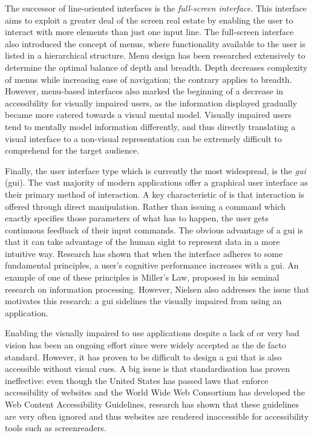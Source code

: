 The successor of line-oriented interfaces is the \textit{full-screen interface}. This interface aims to exploit a greater deal of the screen real estate by enabling the user to interact with more elements than just one input line. The full-screen interface also introduced the concept of menus, where functionality available to the user is listed in a hierarchical structure. Menu design has been researched extensively\cite{paap1986optimal, landauer1985selection, fisher1990optimal} to determine the optimal balance of depth and breadth. Depth decreases complexity of menus while increasing ease of navigation; the contrary applies to breadth. However, menu-based interfaces also marked the beginning of a decrease in accessibility for visually impaired users, as the information displayed gradually became more catered towards a visual mental model. Visually impaired users tend to mentally model information differently, and thus directly translating a visual interface to a non-visual representation can be extremely difficult to comprehend for the target audience\cite{edwards1994providing}.

Finally, the user interface type which is currently the most widespread, is the \textit{\acrlong{gui}} (\acrshort{gui}). The vast majority of modern applications offer a graphical user interface as their primary method of interaction. A key characteristic of  is that interaction is offered through direct manipulation. Rather than issuing a command which exactly specifies those parameters of what has to happen, the user gets continuous feedback of their input commands. The obvious advantage of a \acrshort{gui} is that it can take advantage of the human sight to represent data in a more intuitive way. Research has shown that when the interface adheres to some fundamental principles, a user's cognitive performance increases with a \acrshort{gui}. An example of one of these principles is Miller's Law, proposed in his seminal research on information processing\cite{miller1956magical}. However, Nielsen also addresses the issue that motivates this research: a \acrshort{gui} sidelines the visually impaired from using an application.

Enabling the visually impaired to use applications despite a lack of or very bad vision has been an ongoing effort since  were widely accepted as the de facto standard\cite{boyd1990graphical}. However, it has proven to be difficult to design a \acrshort{gui} that is also accessible without visual cues. A big issue is that standardisation has proven ineffective: even though the United States has passed laws that enforce accessibility of websites\cite{Secti81:online} and the World Wide Web Consortium has developed the Web Content Accessibility Guidelines\cite{WebCo83:online}, research has shown that these guidelines are very often ignored and thus websites are rendered inaccessible for accessibility tools such as screenreaders\cite{leuthold2008beyond}.

